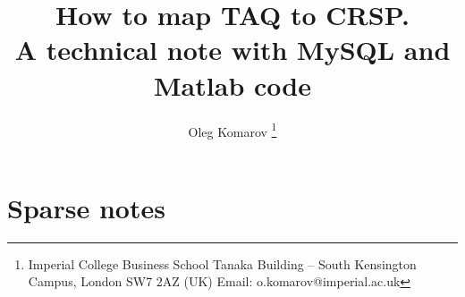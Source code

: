 \documentclass[journal,10pt]{IEEEtran}
\title{How to map TAQ to CRSP.\\ \Large{A technical note with MySQL and Matlab code}}
\author{Oleg Komarov\IEEEauthorrefmark{1}
\thanks{\IEEEauthorrefmark{1}Imperial College Business School\newline
                             Tanaka Building -- South Kensington Campus, London SW7 2AZ (UK)\newline
                             Email: o.komarov@imperial.ac.uk}}
\begin{document}
    \maketitle

    \section{Sparse notes}


%    
%   
\end{document}
